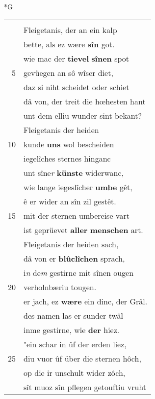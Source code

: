 \documentclass[8pt,a4paper,notitlepage]{article}
\begin{document}
\begin{table}[ht]
\begin{minipage}[t]{0.5\linewidth}
\small
\begin{center}*G
\end{center}
\begin{tabular}{rl}
 & \textbf{\begin{large}E\end{large}z} was ein heiden vaterhalp,\\ 
 & Fleigetanis, der an ein kalp\\ 
 & bette, als ez wære \textbf{sîn} got.\\ 
 & wie mac der \textbf{tievel} \textbf{sînen} spot\\ 
5 & gevüegen an sô wîser diet,\\ 
 & daz si niht scheidet oder schiet\\ 
 & dâ von, der treit die hœhesten hant\\ 
 & unt dem elliu wunder sint bekant?\\ 
 & Fleigetanis der heiden\\ 
10 & kunde \textbf{uns} wol bescheiden\\ 
 & iegelîches sternes hinganc\\ 
 & unt sîne\textit{r} \textbf{künste} widerwanc,\\ 
 & wie lange iegeslîcher \textbf{umbe} gêt,\\ 
 & ê er wider an sîn zil gestêt.\\ 
15 & mit der sternen umbereise vart\\ 
 & ist geprüevet \textbf{aller} \textbf{menschen} art.\\ 
 & Fleigetanis der heiden sach,\\ 
 & dâ von er \textbf{blûclîchen} sprach,\\ 
 & i\textit{n} de\textit{m} gestirne mit sînen ougen\\ 
20 & verholnbæriu tougen.\\ 
 & er jach, ez \textbf{wære} ein dinc, der Grâl.\\ 
 & des namen las er sunder twâl\\ 
 & inme gestirne, wie \textbf{der} hiez.\\ 
 & "ein schar in ûf der erden liez,\\ 
25 & diu vuor ûf über die sternen hôch,\\ 
 & op die ir unschult wider zôch,\\ 
 & sît muoz sîn pflegen getouftiu vruht\\ 

\end{tabular}
\end{minipage}
\end{table}
\end{document}
